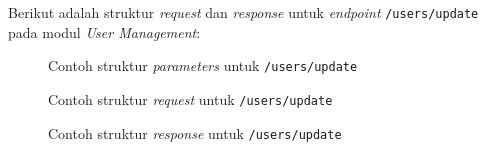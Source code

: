 Berikut adalah struktur \textit{request} dan \textit{response} untuk \textit{endpoint} \texttt{/users/update} pada modul \textit{User Management}:
\begin{figure}
    \centering
    \caption{Contoh struktur \textit{parameters} untuk \texttt{/users/update}}
    \label{fig:request_update_user_params}
\end{figure}
\begin{figure}
    \centering
    \caption{Contoh struktur \textit{request} untuk \texttt{/users/update}}
    \label{fig:request_update_user}
\end{figure}

\begin{figure}
    \centering
    \caption{Contoh struktur \textit{response} untuk \texttt{/users/update}}
    \label{fig:response_update_user}
\end{figure}


